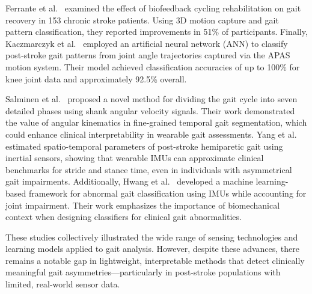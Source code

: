 Ferrante et al.\ \cite{ref18} examined the effect of biofeedback cycling rehabilitation on gait recovery in 153 chronic stroke patients. Using 3D motion capture and 
gait pattern classification, they reported improvements in 51\% of participants. Finally, Kaczmarczyk et al.\ \cite{ref19} employed an artificial neural network (ANN) 
to classify post-stroke gait patterns from joint angle trajectories captured via the APAS motion system. Their model achieved classification accuracies of up to 100\% 
for knee joint data and approximately 92.5\% overall.

Salminen et al.~\cite{ref20} proposed a novel method for dividing the gait cycle into seven detailed phases using shank angular velocity signals. Their work 
demonstrated the value of angular kinematics in fine-grained temporal gait segmentation, which could enhance clinical interpretability in wearable gait 
assessments. Yang et al.~\cite{ref21} estimated spatio-temporal parameters of post-stroke hemiparetic gait using inertial sensors, showing that wearable IMUs can 
approximate clinical benchmarks for stride and stance time, even in individuals with asymmetrical gait impairments. Additionally, Hwang et al.~\cite{ref22} 
developed a machine learning-based framework for abnormal gait classification using IMUs while accounting for joint impairment. Their work emphasizes the 
importance of biomechanical context when designing classifiers for clinical gait abnormalities.

These studies collectively illustrated the wide range of sensing technologies and learning models applied to gait analysis. However, despite these advances, 
there remains a notable gap in lightweight, interpretable methods that detect clinically meaningful gait asymmetries—particularly in post-stroke populations with 
limited, real-world sensor data.
